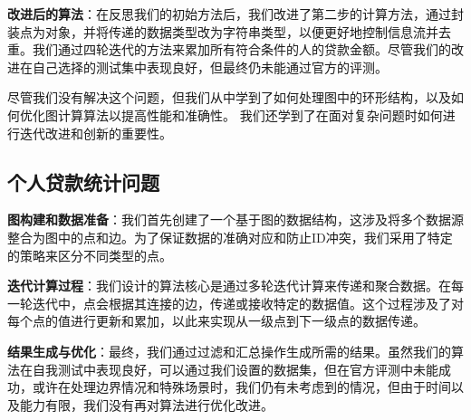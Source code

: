 \textbf{改进后的算法}：在反思我们的初始方法后，我们改进了第二步的计算方法，通过封装点为对象，并将传递的数据类型改为字符串类型，以便更好地控制信息流并去重。我们通过四轮迭代的方法来累加所有符合条件的人的贷款金额。尽管我们的改进在自己选择的测试集中表现良好，但最终仍未能通过官方的评测。

尽管我们没有解决这个问题，但我们从中学到了如何处理图中的环形结构，以及如何优化图计算算法以提高性能和准确性。
我们还学到了在面对复杂问题时如何进行迭代改进和创新的重要性。

\subsection{个人贷款统计问题}
\textbf{图构建和数据准备}：我们首先创建了一个基于图的数据结构，这涉及将多个数据源整合为图中的点和边。为了保证数据的准确对应和防止ID冲突，我们采用了特定的策略来区分不同类型的点。

\textbf{迭代计算过程}：我们设计的算法核心是通过多轮迭代计算来传递和聚合数据。在每一轮迭代中，点会根据其连接的边，传递或接收特定的数据值。这个过程涉及了对每个点的值进行更新和累加，以此来实现从一级点到下一级点的数据传递。

\textbf{结果生成与优化}：最终，我们通过过滤和汇总操作生成所需的结果。虽然我们的算法在自我测试中表现良好，可以通过我们设置的数据集，但在官方评测中未能成功，或许在处理边界情况和特殊场景时，我们仍有未考虑到的情况，但由于时间以及能力有限，我们没有再对算法进行优化改进。
